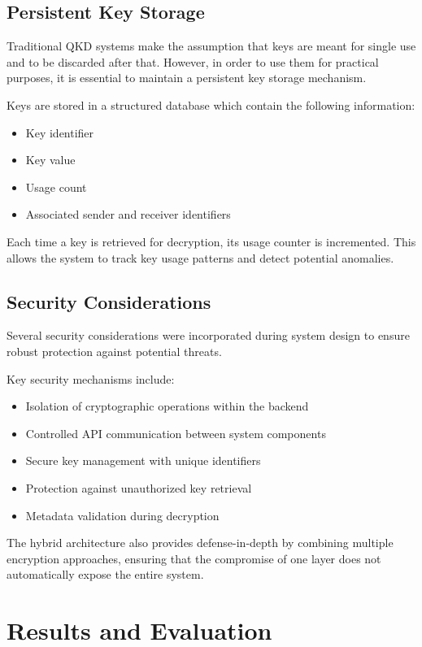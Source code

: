 \documentclass[conference]{IEEEtran}
\begin{document}
\subsection{Persistent Key Storage}\label{SCM}

Traditional QKD systems make the assumption that keys are meant for single use and to be discarded after that. However, in order to use them for practical purposes, it is essential to maintain a persistent key storage mechanism.

Keys are stored in a structured database which contain the following information:
\begin{itemize}
    \item Key identifier
    \item Key value
    \item Usage count
    \item Associated sender and receiver identifiers
\end{itemize}

Each time a key is retrieved for decryption, its usage counter
is incremented. This allows the system to track key usage
patterns and detect potential anomalies.

\subsection{Security Considerations}

Several security considerations were incorporated during system design to ensure robust protection against potential threats.

Key security mechanisms include:
\begin{itemize}
    \item Isolation of cryptographic operations within the backend
    \item Controlled API communication between system components
    \item Secure key management with unique identifiers
    \item Protection against unauthorized key retrieval
    \item Metadata validation during decryption
\end{itemize}

The hybrid architecture also provides defense-in-depth by combining multiple encryption approaches, ensuring that the compromise of one layer does not automatically expose the entire system.

\section{Results and Evaluation}
\end{document}
